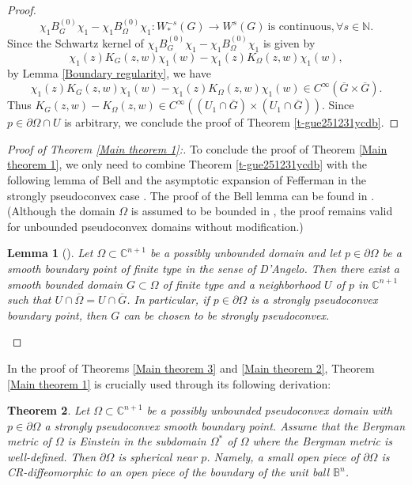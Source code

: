 \documentclass[a4paper,centertags,oneside,12pt]{amsart}
\newtheorem{theorem}{Theorem}[section]
\newtheorem{lemma}[theorem]{Lemma}
\numberwithin{equation}{section}
\begin{document}
\begin{proof}
\begin{equation*}
    \chi_1 B_G^{(0)}\chi_1-\chi_1 B_\Omega^{(0)}\chi_1: W_\ast^{-s}(G)\rightarrow W^s(G)~\text{is continuous}, \forall s\in \mathbb N.
\end{equation*}
Since the Schwartz kernel of $\chi_1 B_{G}^{(0)}\chi_1-\chi_1 B_\Omega^{(0)}\chi_1$ is given by $$\chi_1 (z)K_G(z, w)\chi_1(w)-\chi_1 (z)K_{\Omega}(z, w)\chi_1(w),$$  by Lemma \ref{Boundary regularity}, we have 
$$\chi_1 (z)K_G(z, w)\chi_1(w)-\chi_1 (z)K_{\Omega}(z, w)\chi_1(w)\in C^\infty(\overline G\times\overline G).$$
Thus $K_G(z, w)-K_{\Omega}(z, w)\in C^\infty((U_1\cap\overline G)\times (U_1\cap\overline G))$. 
Since $p\in\partial \Omega\cap U$ is arbitrary, we conclude the proof of Theorem \ref{t-gue251231ycdb}.
\end{proof}

\begin{proof}[Proof of Theorem \ref{Main theorem 1}:] To conclude the proof of Theorem \ref{Main theorem 1}, we only need to combine Theorem  \ref{t-gue251231ycdb}  with the following lemma of Bell and the asymptotic expansion of Fefferman in the strongly pseudoconvex case \cite{Fe74}. The  proof of the Bell lemma  can be found in \cite[Section 4]{Be86}. (Although the domain $\Omega$ is assumed to be bounded in \cite{Be86}, the proof remains valid for unbounded pseudoconvex domains without modification.)
\begin{lemma}[\cite{Be86}]\label{subdomian}
Let $\Omega\subset\mathbb C^{n+1}$ be a possibly unbounded domain and let $p\in\partial \Omega$ be a smooth boundary point of finite type in the sense of D'Angelo. Then there exist a smooth bounded domain $G\subset \Omega$ of finite type and a neighborhood $U$ of $p$ in $\mathbb C^{n+1}$ such that
$U\cap\overline \Omega = U\cap\overline G$. In particular, if $p\in\partial \Omega$ is a strongly pseudoconvex boundary point, then $G$ can be chosen to be strongly pseudoconvex.
\end{lemma}
\end{proof}
In the proof of Theorems \ref{Main theorem 3}  and \ref{Main theorem 2},  Theorem \ref{Main theorem 1} is crucially used  through its  following derivation:  
\begin{theorem}\label{spherical}
    Let $\Omega\subset\mathbb C^{n+1}$ be a possibly unbounded pseudoconvex domain with $p\in\partial \Omega$ a strongly pseudoconvex smooth boundary point. Assume that the Bergman metric of $\Omega$ is Einstein in the subdomain $\Omega^*$ of $\Omega$ where the Bergman metric is well-defined. Then $\partial \Omega$ is spherical near $p$. Namely, a small open piece of 
$\partial\Omega$ is CR-diffeomorphic to an open piece of the boundary of the unit ball $\mathbb{B}^n$. 
\end{theorem}
\end{document}
